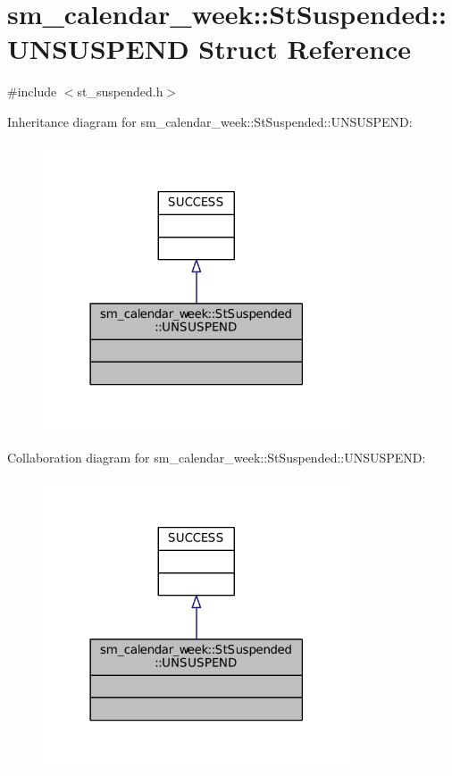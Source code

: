 \hypertarget{structsm__calendar__week_1_1StSuspended_1_1UNSUSPEND}{}\section{sm\+\_\+calendar\+\_\+week\+:\+:St\+Suspended\+:\+:U\+N\+S\+U\+S\+P\+E\+ND Struct Reference}
\label{structsm__calendar__week_1_1StSuspended_1_1UNSUSPEND}


{\ttfamily \#include $<$st\+\_\+suspended.\+h$>$}



Inheritance diagram for sm\+\_\+calendar\+\_\+week\+:\+:St\+Suspended\+:\+:U\+N\+S\+U\+S\+P\+E\+ND\+:
\nopagebreak
\begin{figure}[H]
\begin{center}
\leavevmode
\includegraphics[width=258pt]{structsm__calendar__week_1_1StSuspended_1_1UNSUSPEND__inherit__graph}
\end{center}
\end{figure}


Collaboration diagram for sm\+\_\+calendar\+\_\+week\+:\+:St\+Suspended\+:\+:U\+N\+S\+U\+S\+P\+E\+ND\+:
\nopagebreak
\begin{figure}[H]
\begin{center}
\leavevmode
\includegraphics[width=258pt]{structsm__calendar__week_1_1StSuspended_1_1UNSUSPEND__coll__graph}
\end{center}
\end{figure}


